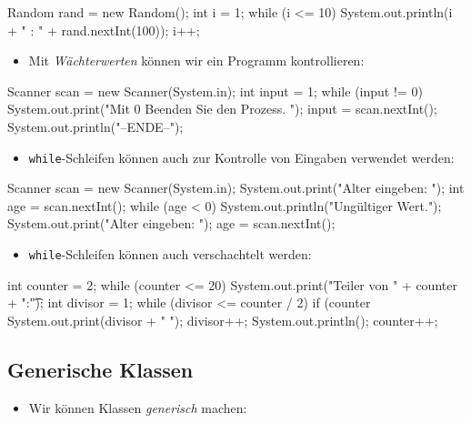 \documentclass[a4paper,10pt, dvipsnames]{report}
\newcommand{\javaInLine}[1]{\texttt{#1}}
\begin{document}
\begin{javacodebox}
    Random rand = new Random();
    int i = 1;
    while (i <= 10) {
        System.out.println(i + " : " + rand.nextInt(100));
        i++;
    }
\end{javacodebox}

\begin{itemize}
    \item Mit \textit{Wächterwerten} können wir ein Programm kontrollieren:
\end{itemize}

\begin{javacodebox}
Scanner scan = new Scanner(System.in);
int input = 1;
while (input != 0) {
    System.out.print("Mit 0 Beenden Sie den Prozess. ");
    input = scan.nextInt();
}
System.out.println("--ENDE--");
\end{javacodebox}

\begin{itemize}
    \item \javaInLine{while}-Schleifen können auch zur Kontrolle von Eingaben verwendet werden:
\end{itemize}

\begin{javacodebox}
Scanner scan = new Scanner(System.in);
System.out.print("Alter eingeben: ");
int age = scan.nextInt();
while (age < 0) {
    System.out.println("Ungültiger Wert.");
    System.out.print("Alter eingeben: ");
    age = scan.nextInt();
}
\end{javacodebox}

\begin{itemize}
    \item \javaInLine{while}-Schleifen können auch verschachtelt werden:
\end{itemize}

\begin{javacodebox}
int counter = 2;
while (counter <= 20) {
    System.out.print("Teiler von " + counter + ":\t");
    int divisor = 1;
    while (divisor <= counter / 2) {
        if (counter %
            System.out.print(divisor + " ");
        divisor++;
    }
    System.out.println();
    counter++;
}
\end{javacodebox}

\subsection{Generische Klassen}

\begin{itemize}
    \item Wir können Klassen \textit{generisch} machen:
\end{itemize}
\end{document}
